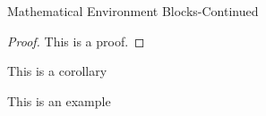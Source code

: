 \documentclass{beamer}
\begin{document}
    \begin{frame}{Mathematical Environment Blocks-Continued}
        \begin{proof} 
            This is a proof. 
        \end{proof}
        
        \begin{corollary}
            This is a corollary
        \end{corollary}
        
        \begin{example}
            This is an example 
        \end{example}
    \end{frame}

    
\end{document}
